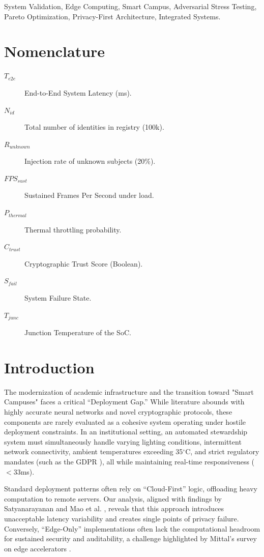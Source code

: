 \documentclass[conference]{IEEEtran}
\begin{document}
\begin{IEEEkeywords}
System Validation, Edge Computing, Smart Campus, Adversarial Stress Testing, Pareto Optimization, Privacy-First Architecture, Integrated Systems.
\end{IEEEkeywords}

\section*{Nomenclature}
\begin{description}
    \item[$T_{e2e}$] End-to-End System Latency (ms).
    \item[$N_{id}$] Total number of identities in registry (100k).
    \item[$R_{unknown}$] Injection rate of unknown subjects (20\%).
    \item[$FPS_{sust}$] Sustained Frames Per Second under load.
    \item[$P_{thermal}$] Thermal throttling probability.
    \item[$C_{trust}$] Cryptographic Trust Score (Boolean).
    \item[$S_{fail}$] System Failure State.
    \item[$T_{junc}$] Junction Temperature of the SoC.
\end{description}

\section{Introduction}
The modernization of academic infrastructure and the transition toward "Smart Campuses" \cite{b12} faces a critical ``Deployment Gap.'' While literature abounds with highly accurate neural networks \cite{b1, b2} and novel cryptographic protocols, these components are rarely evaluated as a cohesive system operating under hostile deployment constraints. In an institutional setting, an automated stewardship system must simultaneously handle varying lighting conditions, intermittent network connectivity, ambient temperatures exceeding 35$^\circ$C, and strict regulatory mandates (such as the GDPR \cite{b16}), all while maintaining real-time responsiveness ($<33$ms).

Standard deployment patterns often rely on ``Cloud-First'' logic, offloading heavy computation to remote servers. Our analysis, aligned with findings by Satyanarayanan \cite{b4} and Mao et al. \cite{b21}, reveals that this approach introduces unacceptable latency variability and creates single points of privacy failure. Conversely, ``Edge-Only'' implementations \cite{b5} often lack the computational headroom for sustained security and auditability, a challenge highlighted by Mittal's survey on edge accelerators \cite{b18}.
\end{document}
